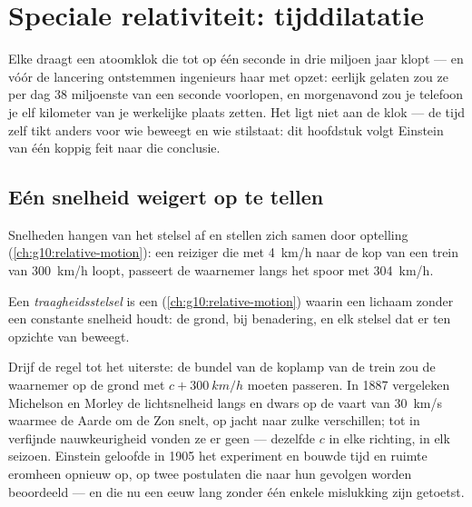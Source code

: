 \chapter{Speciale relativiteit: tijddilatatie}\label{ch:g12:special-relativity}

Elke  draagt een atoomklok die tot op één seconde in drie miljoen
jaar klopt --- en vóór de lancering ontstemmen ingenieurs haar met opzet: eerlijk
gelaten zou ze per dag 38 miljoenste van een seconde voorlopen, en morgenavond
zou je telefoon je elf kilometer van je werkelijke plaats zetten. Het ligt niet
aan de klok --- de tijd zelf tikt anders voor wie beweegt en wie stilstaat: dit
hoofdstuk volgt Einstein van één koppig feit naar die conclusie.

\section{Eén snelheid weigert op te tellen}

Snelheden hangen van het stelsel af en stellen zich samen door optelling
(\cref{ch:g10:relative-motion}): een reiziger die met \qty{4}{km/h} naar de kop
van een trein van \qty{300}{km/h} loopt, passeert de waarnemer langs het spoor
met \qty{304}{km/h}.

\begin{definition}[Traagheidsstelsel]\label{def:g12:special-relativity:inertial}
Een \emph{traagheidsstelsel} is een 
(\cref{ch:g10:relative-motion}) waarin een lichaam zonder  een constante
snelheid houdt: de grond, bij benadering, en elk stelsel dat er  ten opzichte van beweegt.
\end{definition}

Drijf de regel tot het uiterste: de bundel van de koplamp van de trein zou de
waarnemer op de grond met $c + \qty{300}{km/h}$ moeten passeren. In 1887
vergeleken Michelson en Morley de lichtsnelheid langs en dwars op de vaart van
\qty{30}{km/s} waarmee de Aarde om de Zon snelt, op jacht naar zulke
verschillen; tot in verfijnde nauwkeurigheid vonden ze er geen --- dezelfde $c$
in elke richting, in elk seizoen. Einstein geloofde in 1905 het experiment en
bouwde tijd en ruimte eromheen opnieuw op, op twee postulaten die naar hun
gevolgen worden beoordeeld --- en die nu een eeuw lang zonder één enkele
mislukking zijn getoetst.

